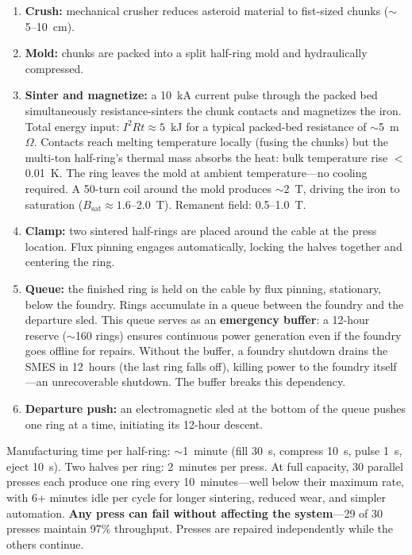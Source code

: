 \documentclass[12pt,letterpaper]{article}
\begin{document}
\begin{enumerate}[label=(\roman*)]
\item \textbf{Crush:} mechanical crusher reduces asteroid material to fist-sized chunks (${\sim}$5--10~cm).
\item \textbf{Mold:} chunks are packed into a split half-ring mold and hydraulically compressed.
\item \textbf{Sinter and magnetize:} a 10~kA current pulse through the packed bed simultaneously resistance-sinters the chunk contacts and magnetizes the iron. Total energy input: $I^2 R t \approx 5$~kJ for a typical packed-bed resistance of ${\sim}$5~m$\Omega$. Contacts reach melting temperature locally (fusing the chunks) but the multi-ton half-ring's thermal mass absorbs the heat: bulk temperature rise $<$0.01~K. The ring leaves the mold at ambient temperature---no cooling required. A 50-turn coil around the mold produces ${\sim}$2~T, driving the iron to saturation ($B_{\text{sat}} \approx 1.6$--2.0~T). Remanent field: 0.5--1.0~T.
\item \textbf{Clamp:} two sintered half-rings are placed around the cable at the press location. Flux pinning engages automatically, locking the halves together and centering the ring.
\item \textbf{Queue:} the finished ring is held on the cable by flux pinning, stationary, below the foundry. Rings accumulate in a queue between the foundry and the departure sled. This queue serves as an \textbf{emergency buffer}: a 12-hour reserve (${\sim}$160 rings) ensures continuous power generation even if the foundry goes offline for repairs. Without the buffer, a foundry shutdown drains the SMES in 12~hours (the last ring falls off), killing power to the foundry itself---an unrecoverable shutdown. The buffer breaks this dependency.
\item \textbf{Departure push:} an electromagnetic sled at the bottom of the queue pushes one ring at a time, initiating its 12-hour descent.
\end{enumerate}

Manufacturing time per half-ring: ${\sim}$1~minute (fill 30~s, compress 10~s, pulse 1~s, eject 10~s). Two halves per ring: 2~minutes per press. At full capacity, 30 parallel presses each produce one ring every 10~minutes---well below their maximum rate, with 6+ minutes idle per cycle for longer sintering, reduced wear, and simpler automation. \textbf{Any press can fail without affecting the system}---29 of 30 presses maintain 97\% throughput. Presses are repaired independently while the others continue.
\end{document}
